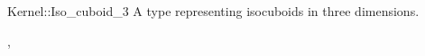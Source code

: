 \begin{ccRefConcept}{Kernel::Iso_cuboid_3}
A type representing isocuboids in three dimensions.

\ccRefines
{},

\ccSeeAlso
{}

\end{ccRefConcept}
